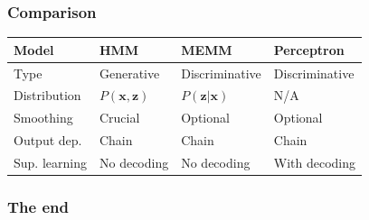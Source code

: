 \documentclass[usenames,dvipsnames]{beamer}
\newcommand{\x}{\mathbf{x}}
\newcommand{\z}{\mathbf{z}}
\begin{document}
\begin{frame}
  \frametitle{Comparison}
  \begin{center}
    \begin{tabular}{l|lll}
      Model         & HMM           & MEMM             & Perceptron \\\hline
      Type          & Generative    & Discriminative   & Discriminative \\
      Distribution  & $P(\x,\z)$    & $P(\z|\x)$       & N/A\\
      Smoothing     & Crucial       & Optional         & Optional \\
      Output   dep. & Chain         & Chain            & Chain \\
      Sup. learning & No decoding   & No decoding      & With decoding \\
    \end{tabular}
  \end{center}

\end{frame}

\begin{frame}
  \frametitle{The end}
\end{frame}
\end{document}
